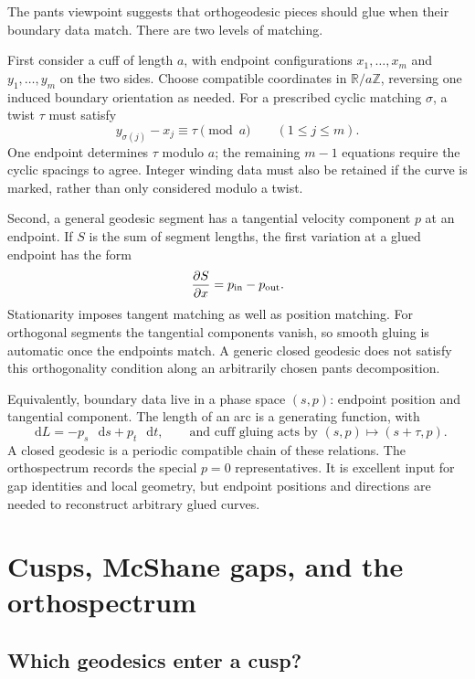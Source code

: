 \documentclass[11pt,a4paper]{article}
\numberwithin{equation}{section}
\theoremstyle{definition}
\theoremstyle{remark}
\newcommand{\dd}{\mathop{}\!\mathrm d}
\newcommand{\RR}{\mathbb R}
\newcommand{\ZZ}{\mathbb Z}
\begin{document}
The pants viewpoint suggests that orthogeodesic pieces should glue when
their boundary data match. There are two levels of matching.

First consider a cuff of length $a$, with endpoint configurations
$x_1,\ldots,x_m$ and $y_1,\ldots,y_m$ on the two sides. Choose compatible
coordinates in $\RR/a\ZZ$, reversing one induced boundary orientation
as needed. For a prescribed cyclic matching $\sigma$, a twist $\tau$
must satisfy
\begin{equation}
 y_{\sigma(j)}-x_j\equiv\tau\pmod a
       \qquad(1\le j\le m).
 \label{eq:endpointmatch}
\end{equation}
One endpoint determines $\tau$ modulo $a$; the remaining $m-1$ equations
require the cyclic spacings to agree. Integer winding data must also be
retained if the curve is marked, rather than only considered modulo a
twist.

Second, a general geodesic segment has a tangential velocity component
$p$ at an endpoint. If $S$ is the sum of segment lengths, the first
variation at a glued endpoint has the form
\begin{equation}
 \frac{\partial S}{\partial x}=p_{\rm in}-p_{\rm out}.
 \label{eq:momentummatch}
\end{equation}
Stationarity imposes tangent matching as well as position matching. For
orthogonal segments the tangential components vanish, so smooth gluing
is automatic once the endpoints match. A generic closed geodesic does
not satisfy this orthogonality condition along an arbitrarily chosen
pants decomposition.

Equivalently, boundary data live in a phase space $(s,p)$: endpoint
position and tangential component. The length of an arc is a generating
function, with
\[
 \dd L=-p_s\,\dd s+p_t\,\dd t,
 \qquad\text{and cuff gluing acts by }(s,p)\longmapsto(s+\tau,p).
\]
A closed geodesic is a periodic compatible chain of these relations.
The orthospectrum records the special $p=0$ representatives. It is
excellent input for gap identities and local geometry, but endpoint
positions and directions are needed to reconstruct arbitrary glued curves.

\section{Cusps, McShane gaps, and the orthospectrum}
\label{sec:cusps}

\subsection{Which geodesics enter a cusp?}
\end{document}
